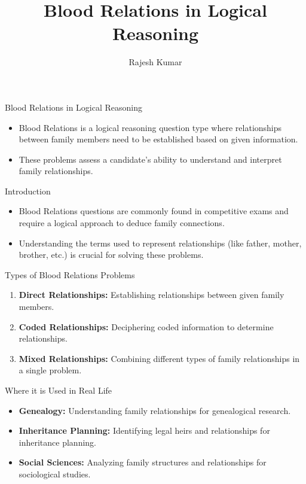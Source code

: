 \title{Blood Relations in Logical Reasoning}
\author{Rajesh Kumar}
\date{}

\begin{frame}
  \titlepage
\end{frame}

\begin{frame}{Blood Relations in Logical Reasoning}
  \begin{itemize}
    \item Blood Relations is a logical reasoning question type where relationships between family members need to be established based on given information.
    \item These problems assess a candidate's ability to understand and interpret family relationships.
  \end{itemize}
\end{frame}

\begin{frame}{Introduction}
  \begin{itemize}
    \item Blood Relations questions are commonly found in competitive exams and require a logical approach to deduce family connections.
    \item Understanding the terms used to represent relationships (like father, mother, brother, etc.) is crucial for solving these problems.
  \end{itemize}
\end{frame}

\begin{frame}{Types of Blood Relations Problems}
  \begin{enumerate}
    \item \textbf{Direct Relationships:} Establishing relationships between given family members.
    \item \textbf{Coded Relationships:} Deciphering coded information to determine relationships.
    \item \textbf{Mixed Relationships:} Combining different types of family relationships in a single problem.
  \end{enumerate}
\end{frame}

\begin{frame}{Where it is Used in Real Life}
  \begin{itemize}
    \item \textbf{Genealogy:} Understanding family relationships for genealogical research.
    \item \textbf{Inheritance Planning:} Identifying legal heirs and relationships for inheritance planning.
    \item \textbf{Social Sciences:} Analyzing family structures and relationships for sociological studies.
  \end{itemize}
\end{frame}

